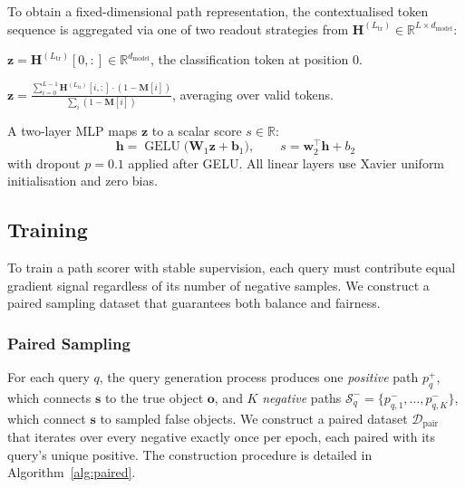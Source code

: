 To obtain a fixed-dimensional path representation, the contextualised token
sequence is aggregated via one of two readout strategies from
$\mathbf{H}^{(L_{\text{tr}})} \in \mathbb{R}^{L \times d_{\text{model}}}$:

\begin{description}[nosep]
    \item[CLS.] $\mathbf{z} = \mathbf{H}^{(L_{\text{tr}})}[0, :] \in \mathbb{R}^{d_{\text{model}}}$, the classification token at position 0.
    \item[Mean.] $\mathbf{z} = \frac{\sum_{i=0}^{L-1} \mathbf{H}^{(L_{\text{tr}})}[i, :] \cdot (1 - \mathbf{M}[i])}{\sum_i (1 - \mathbf{M}[i])}$, averaging over valid tokens.
\end{description}

A two-layer MLP maps $\mathbf{z}$ to a scalar score $s \in \mathbb{R}$:
\begin{equation}
    \mathbf{h} = \operatorname{GELU}\bigl(\mathbf{W}_1 \mathbf{z} + \mathbf{b}_1\bigr),
    \qquad
    s = \mathbf{w}_2^{\top} \mathbf{h} + b_2
\label{eq:readout}
\end{equation}
with dropout $p = 0.1$ applied after GELU.  All linear layers use Xavier
uniform initialisation and zero bias.

\vspace{-1em}
\subsection{Training}
\vspace{-1em}
\label{sec:training}

To train a path scorer with stable supervision, each query must contribute equal gradient
signal regardless of its number of negative samples.  We construct a paired sampling
dataset that guarantees both balance and fairness.

\vspace{-1em}
\subsubsection{Paired Sampling}
\vspace{-1em}
\label{sec:paired-sampling}

For each query $q$, the query generation process produces one \textit{positive} path
$p^+_q$, which connects $\mathbf{s}$ to the true object $\mathbf{o}$, and $K$ \textit{negative}
paths $\mathcal{S}^-_q = \{p^-_{q,1}, \ldots, p^-_{q,K}\}$, which connect $\mathbf{s}$ to
sampled false objects.  We construct a paired dataset $\mathcal{D}_{\text{pair}}$
that iterates over every negative exactly once per epoch, each paired with its query's
unique positive.  The construction procedure is detailed in Algorithm~\ref{alg:paired}.

